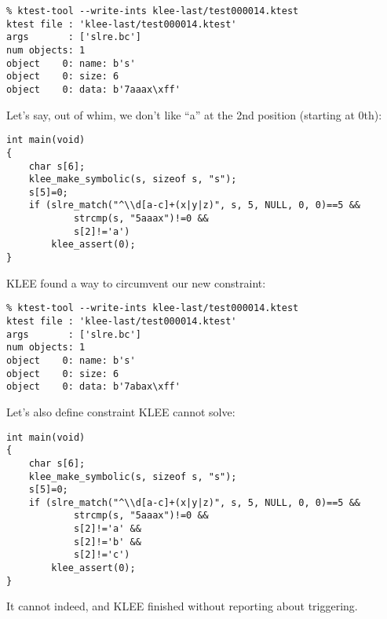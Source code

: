 \begin{lstlisting}
% ktest-tool --write-ints klee-last/test000014.ktest
ktest file : 'klee-last/test000014.ktest'
args       : ['slre.bc']
num objects: 1
object    0: name: b's'
object    0: size: 6
object    0: data: b'7aaax\xff'
\end{lstlisting}

Let's say, out of whim, we don't like ``a'' at the 2nd position (starting at 0th):

\begin{lstlisting}
int main(void)
{
	char s[6];
	klee_make_symbolic(s, sizeof s, "s");
	s[5]=0;
	if (slre_match("^\\d[a-c]+(x|y|z)", s, 5, NULL, 0, 0)==5 &&
			strcmp(s, "5aaax")!=0 &&
			s[2]!='a')
		klee_assert(0);
}
\end{lstlisting}

KLEE found a way to circumvent our new constraint:

\begin{lstlisting}
% ktest-tool --write-ints klee-last/test000014.ktest
ktest file : 'klee-last/test000014.ktest'
args       : ['slre.bc']
num objects: 1
object    0: name: b's'
object    0: size: 6
object    0: data: b'7abax\xff'
\end{lstlisting}

Let's also define constraint KLEE cannot solve:

\begin{lstlisting}
int main(void)
{
	char s[6];
	klee_make_symbolic(s, sizeof s, "s");
	s[5]=0;
	if (slre_match("^\\d[a-c]+(x|y|z)", s, 5, NULL, 0, 0)==5 &&
			strcmp(s, "5aaax")!=0 &&
			s[2]!='a' &&
			s[2]!='b' &&
			s[2]!='c')
		klee_assert(0);
}
\end{lstlisting}

It cannot indeed, and KLEE finished without reporting about  triggering.


